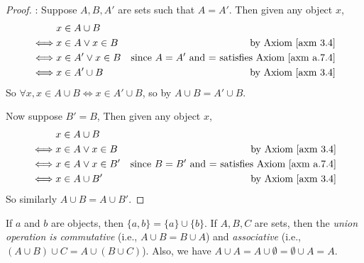 \begin{proof}
: Suppose \(A, B, A'\) are sets such that \(A = A'\). Then given any object \(x\),
\begin{align*}
         & x \in A \cup B \\
    \iff & x \in A \lor x \in B & \text{by \AXM{3.4}} \\
    \iff & x \in A' \lor x \in B & \text{since \(A = A'\) and \(=\) satisfies \AXM{a.7.4}} \\
    \iff & x \in A' \cup B & \text{by \AXM{3.4}} \\
\end{align*}
So \(\forall x, x \in A \cup B \iff x \in A' \cup B\), so by  \(A \cup B = A' \cup B\).

Now suppose \(B' = B\), Then given any object \(x\),
\begin{align*}
         & x \in A \cup B \\
    \iff & x \in A \lor x \in B & \text{by \AXM{3.4}} \\
    \iff & x \in A \lor x \in B' & \text{since \(B = B'\) and \(=\) satisfies \AXM{a.7.4}} \\
    \iff & x \in A \cup B' & \text{by \AXM{3.4}} \\
\end{align*}
So similarly \(A \cup B = A \cup B'\).
\end{proof}

\begin{lemma} \label{lem 3.1.13}
If \(a\) and \(b\) are objects, then \( \{a, b\} = \{ a \} \cup \{ b \} \). If \(A, B, C\) are sets, then the \emph{union operation is commutative} (i.e., \(A \cup B = B \cup A\)) and \emph{associative} (i.e., \((A \cup B) \cup C = A \cup (B \cup C)\)). Also, we have \(A \cup A = A \cup \emptyset = \emptyset \cup A = A\).
\end{lemma}

